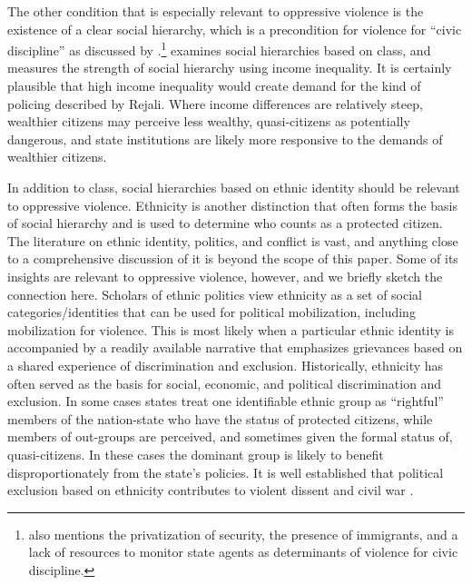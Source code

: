 \documentclass[11pt]{article}
\begin{document}
The other condition that is especially relevant to oppressive violence is the existence of a clear social hierarchy, which is a precondition for violence for ``civic discipline'' as discussed by \citep{Rejali2007}.\footnote{\citet{Rejali2007} also mentions the privatization of security, the presence of immigrants, and a lack of resources to monitor state agents as determinants of violence for civic discipline.} \citet{Haschke2018} examines social hierarchies based on class, and measures the strength of social hierarchy using income inequality. It is certainly plausible that high income inequality would create demand for the kind of policing described by Rejali. Where income differences are relatively steep,  wealthier citizens may perceive less wealthy, quasi-citizens as potentially dangerous, and state institutions are likely more responsive to the demands of wealthier citizens. 

In addition to class, social hierarchies based on ethnic identity should be relevant to oppressive violence. Ethnicity is another distinction that often forms the basis of social hierarchy and is used to determine who counts as a protected citizen. The literature on ethnic identity, politics, and conflict is vast, and anything close to a comprehensive discussion of it is beyond the scope of this paper. Some of its insights are relevant to oppressive violence, however, and we briefly sketch the connection here. Scholars of ethnic politics view ethnicity as a set of social categories/identities that can be used for political mobilization, including mobilization for violence. This is most likely when a particular ethnic identity is accompanied by a readily available narrative that emphasizes grievances based on a shared experience of discrimination and exclusion. Historically, ethnicity has often served as the basis for social, economic, and political discrimination and exclusion. In some cases states treat one identifiable ethnic group as ``rightful'' members of the nation-state who have the status of protected citizens, while members of out-groups are perceived, and sometimes given the formal status of, quasi-citizens. In these cases the dominant group is likely to benefit disproportionately from the state's policies. It is well established that political exclusion based on ethnicity contributes to violent dissent and civil war \citep{birnir2006ethnicity,cederman2013inequality}.
\end{document}
